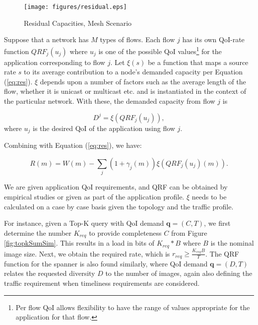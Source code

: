 \begin{figure}
\begin{centering}
    \texttt{[image: figures/residual.eps]}
    \caption{Residual Capacities, Mesh Scenario}
    \label{resf}
\end{centering}
\end{figure}

Suppose that a network has $M$ types of flows. Each flow $j$ has its own
QoI-rate function $QRF_j(u_j)$ where $u_j$ is one of the possible QoI
values\footnote{Per flow QoI allows flexibility to have the range of
values appropriate for the application for that flow.}
for the application corresponding to flow $j$. Let $\xi(s)$ be a function that
maps a source rate $s$ to its average contribution to a node's demanded
capacity per Equation (\ref{eq:res}).
$\xi$ depends upon a number of factors such as the
average length of the flow, whether it is unicast or multicast etc. and
is instantiated in the context of the particular network.
With these, the demanded capacity from flow $j$ is

\begin{equation}
D^j = \xi(QRF_j(u_j)),
\end{equation}
where $u_j$ is the desired QoI of the application using flow $j$.

Combining with Equation (\ref{eq:res}), we have:

\begin{equation}
R(m) = W(m) - \sum_j (1+\gamma_j(m))\xi(QRF_j(u_j)(m))   \label{eq:utility}.
\end{equation}

We are given application QoI requirements, and QRF can be obtained by
empirical studies or given as part of the application profile.
$\xi$ needs to be calculated on a case by case basis
given the topology and the traffic profile.

For instance, given a Top-K query with QoI demand $\textbf{q}=(C,T)$, we first determine the number $K_{req}$ to provide completeness $C$ from Figure \ref{fig:topkSumSim}. This results in a load in bits of $K_{req}*B$ where $B$ is the nominal image size.  Next, we obtain the required rate, which is $r_{req}\geq \frac{K_{req}B}{T}$. The QRF function for the spanner is also found similarly, where QoI demand $\textbf{q}=(D,T)$ relates the requested diversity $D$ to the number of images, again also defining the traffic requirement when timeliness requirements are considered.



